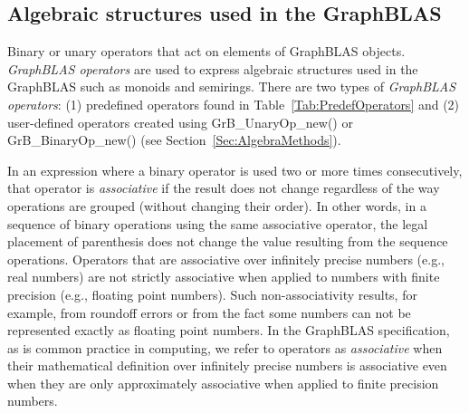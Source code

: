 

\glossEnd



\subsection{Algebraic structures used in the GraphBLAS}

\glossBegin
{} Binary or unary operators that act on elements of GraphBLAS 
objects.  \emph{GraphBLAS operators} are used to express algebraic structures used in the 
GraphBLAS such as monoids and semirings. There are two types of \emph{GraphBLAS operators}: 
(1) predefined operators found in Table~\ref{Tab:PredefOperators} and (2) user-defined 
operators created using {\sf GrB\_UnaryOp\_new()} or {\sf GrB\_BinaryOp\_new()} 
(see Section~\ref{Sec:AlgebraMethods}).

 In an expression where a binary operator is used 
two or more times consecutively, that operator is \emph{associative} if the result 
does not change regardless of the way operations are grouped (without changing their order). 
In other words, in a sequence of binary operations using the same associative 
operator, the legal placement of parenthesis does not change the value resulting 
from the sequence operations.  Operators that are associative over infinitely 
precise numbers (e.g., real numbers) are not strictly associative when applied to 
numbers with finite precision (e.g., floating point numbers). Such non-associativity 
results, for example, from roundoff errors or from the fact some numbers can not 
be represented exactly as floating point numbers.   In the GraphBLAS specification, 
as is common practice in computing, we refer to operators as \emph{associative} 
when their mathematical definition over infinitely precise numbers is associative 
even when they are only approximately associative when applied to finite precision 
numbers.

